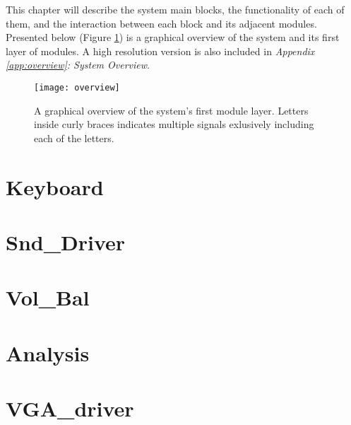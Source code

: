 


This chapter will describe the system main blocks, the functionality of each of them, and the interaction between each block and its adjacent modules. Presented below (Figure \ref{fig:overview}) is a graphical overview of the system and its first layer of modules. A high resolution version is also included in \emph{Appendix \ref{app:overview}: System Overview}.

\begin{figure}[H]
  \centering
  \texttt{[image: overview]}
  \caption{A graphical overview of the system's first module layer. Letters inside curly braces indicates multiple signals exlusively including each of the letters.}
  \label{fig:overview}
\end{figure}

\section{Keyboard}\label{sec:keyboard}


\section{Snd\_Driver}\label{sec:snddriver}


\section{Vol\_Bal}\label{sec:volbal}


\section{Analysis}\label{sec:analysis}


\section{VGA\_driver}\label{sec:vgadriver}


